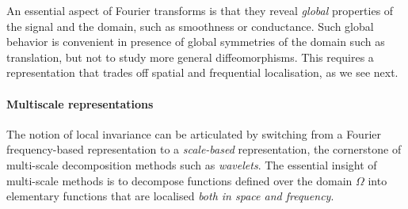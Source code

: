 An essential aspect of Fourier transforms is that they reveal \emph{global} properties of the signal and the domain, such as smoothness or conductance. Such global behavior is convenient in presence of global symmetries of the domain such as translation, but not to study more general diffeomorphisms. This requires a representation that trades off spatial and frequential localisation, as we see next. 


\paragraph{Multiscale representations}
The 
notion of local invariance can be articulated by switching from a Fourier frequency-based representation to a {\em scale-based} representation, the cornerstone of multi-scale decomposition methods such as {\em wavelets}. 
%
The essential insight of multi-scale methods is to decompose functions defined over the domain $\Omega$ into elementary functions that are localised \emph{both in space and frequency}.
